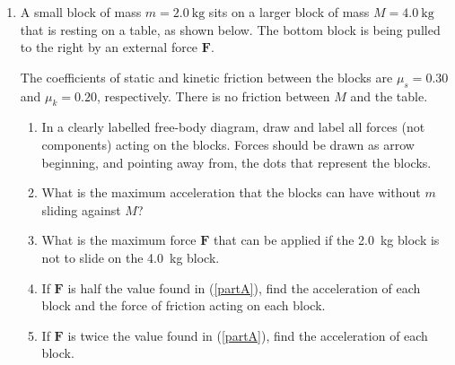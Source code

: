 \begin{enumerate}[itemsep=6pt]
\item A small block of mass $m=\SI{2.0}{\kilo\gram}$ sits on a larger block of
  mass $M=\SI{4.0}{\kilo\gram}$ that is resting on a table, as shown below. The
  bottom block is being pulled to the right by an external force $\bm F$.
  \begin{center}
  \end{center}
  The coefficients of static and kinetic friction between the blocks are
  $\mu_s=0.30$ and $\mu_k=0.20$, respectively. There is no friction between
  $M$ and the table.
  \begin{enumerate}[itemsep=3pt]
  \item In a clearly labelled free-body diagram, draw and label all
    forces (not components) acting on the blocks. Forces should be drawn as
    arrow beginning, and pointing away from, the dots that represent the
    blocks.
      
  \item What is the maximum acceleration that the blocks can have without
    $m$ sliding against $M$?
    
  \item What is the maximum force $\bm F$ that can be applied if the
    \SI{2.0}{\kilo\gram} block is not to slide on the \SI{4.0}{\kilo\gram}
    block.\label{partA}
    
  \item If $\bm F$ is half the value found in (\ref{partA}), find the
    acceleration of each block and the force of friction acting on each block.
    
  \item If $\bm F$ is twice the value found in (\ref{partA}), find the
    acceleration of each block.
  \end{enumerate}
  \begin{center}
  \end{center}


\end{enumerate}
